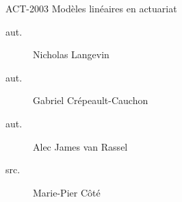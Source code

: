 \begin{contrib}{ACT-2003\: Modèles linéaires en actuariat}
\begin{description}
	\item[aut.] Nicholas Langevin
	\item[aut.] Gabriel Crépeault-Cauchon 
	\item[aut.] Alec James van Rassel
	\item[src.] Marie-Pier Côté
\end{description}
\end{contrib}